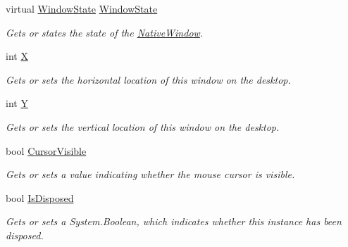\begin{DoxyCompactItemize}
virtual \hyperlink{namespace_open_t_k_ace9268dc87bd36f48c9d9d8b939559b4}{Window\-State} \hyperlink{class_open_t_k_1_1_native_window_a78e6278aa092a82f672ff838ac7c1e2d}{Window\-State}
\begin{DoxyCompactList}\small\item\em Gets or states the state of the \hyperlink{class_open_t_k_1_1_native_window}{Native\-Window}. \end{DoxyCompactList}\item 
int \hyperlink{class_open_t_k_1_1_native_window_a7c5eafcedf58f9b72995633b93657463}{X}
\begin{DoxyCompactList}\small\item\em Gets or sets the horizontal location of this window on the desktop. \end{DoxyCompactList}\item 
int \hyperlink{class_open_t_k_1_1_native_window_a6652ffe8f86f05bddd470872874aa8b8}{Y}
\begin{DoxyCompactList}\small\item\em Gets or sets the vertical location of this window on the desktop. \end{DoxyCompactList}\item 
bool \hyperlink{class_open_t_k_1_1_native_window_a028d01996236ac800257e79392f42c3c}{Cursor\-Visible}
\begin{DoxyCompactList}\small\item\em Gets or sets a value indicating whether the mouse cursor is visible. \end{DoxyCompactList}\item 
bool \hyperlink{class_open_t_k_1_1_native_window_af15932872565db89a7f0fe92f9216699}{Is\-Disposed}
\begin{DoxyCompactList}\small\item\em Gets or sets a System.\-Boolean, which indicates whether this instance has been disposed. \end{DoxyCompactList}\end{DoxyCompactItemize}
